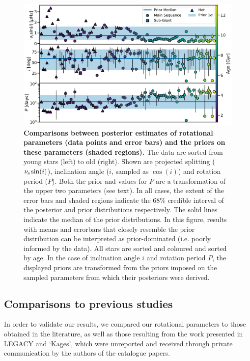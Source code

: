 \begin{figure}
	\centering
	\includegraphics[width=\textwidth]{Images/priors.pdf}
	\caption{\textbf{Comparisons between posterior estimates of rotational parameters (data points and error bars) and the priors on these parameters (shaded regions).} The data are sorted from young stars (left) to old (right). Shown are projected splitting ($\nu_{\rm s}\sin(i)$), inclination angle ($i$, sampled as $\cos(i)$) and rotation period ($P$). Both the prior and values for $P$ are a transformation of the upper two parameters (see text). In all cases, the extent of the error bars and shaded regions indicate the 68\% credible interval of the posterior and prior distributions respectively. The solid lines indicate the median of the prior distributions. In this figure, results with means and errorbars that closely resemble the prior distribution can be interpreted as prior-dominated (i.e. poorly informed by the data). All stars are sorted and coloured and sorted by age. In the case of inclination angle $i$ and rotation period $P$, the displayed priors are transformed from the priors imposed on the sampled parameters from which their posteriors were derived.}
	\label{fig:priors}
\end{figure}

\subsection{Comparisons to previous studies}\label{ssec:litcomp}
In order to validate our results, we compared our rotational parameters to those obtained in the literature, as well as those resulting from the work presented in LEGACY and `Kages', which were unreported and received through private communication by the authors of the catalogue papers.

